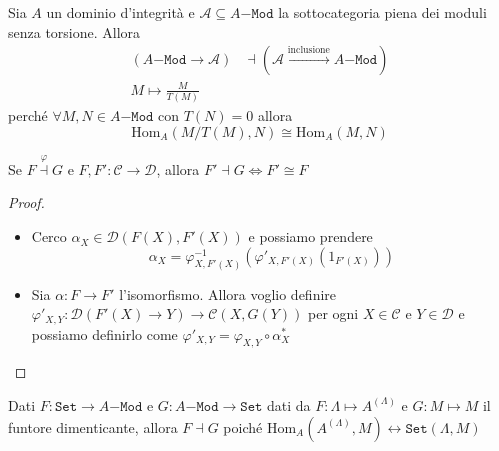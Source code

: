 \begin{example}{}
    Sia \(A\) un dominio d'integrità e \(\mathcal{A} \subseteq A\mathtt{-Mod} \)
    la sottocategoria piena dei moduli senza torsione. Allora
    \begin{align*}
        \left( A\mathtt{-Mod} \to \mathcal{A} \right) &\dashv \left(
        \mathcal{A} \overset{\text{inclusione}}{\to} A\mathtt{-Mod} \right) \\
            M \mapsto \frac{M}{T{(M)}} &
    \end{align*}
    perché \(\forall M, N \in A\mathtt{-Mod}\) con \(T{(N)} = 0\) allora
    \[
      \mathrm{Hom}_A{(M / T{(M)} , N)} \cong \mathrm{Hom}_A {(M, N)}
    \]
\end{example}

\begin{proposition}{}
    Se \(F \overset{\varphi }{\dashv } G\) e \(F, F' : \mathcal{C} \to
    \mathcal{D}\), allora \(F' \dashv G \iff F' \cong F\) 
\end{proposition}
\begin{proof}\( \)
\begin{itemize}
    \item[\(\implies \)] Cerco \(\alpha_X \in \mathcal{D}{(F{(X)}, F'{(X)})}\) e
        possiamo prendere
        \[
          \alpha_X = \varphi_{X,F'{(X)}} ^{-1} {\left( \varphi '_{X, F'{(X)}}
          {(1_{F'{(X)}} )} \right)} 
        \]
    \item[\(\impliedby \)] Sia \(\alpha : F \to F'\) l'isomorfismo. Allora
        voglio definire \(\varphi'_{X, Y}  : \mathcal{D}{(F'{(X)} \to Y)} \to
        \mathcal{C}{(X, G{(Y)})}\) per ogni \(X \in \mathcal{C}\) e \(Y \in
        \mathcal{D}\) e possiamo definirlo come \(\varphi'_{X, Y} = \varphi_{X,
        Y} \circ \alpha_X^{*}\)
\end{itemize}
\end{proof}

\begin{example}{}
    Dati \(F : \mathtt{Set} \to A\mathtt{-Mod}\) e \(G : A\mathtt{-Mod} \to
    \mathtt{Set}\) dati da \(F: \Lambda \mapsto A^{{(\Lambda)}}\) e \(G : M
    \mapsto M\) il funtore dimenticante, allora \(F \dashv G\) poiché
    \(\mathrm{Hom}_A {(A^{{(\Lambda)}}, M)} \leftrightarrow
    \mathtt{Set}{(\Lambda, M)}\) 
\end{example}

